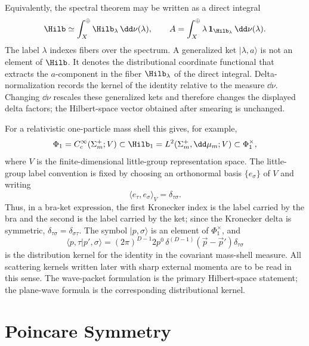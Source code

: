 \begin{definition}
\label{def:direct-integral-coordinate-ket}
Equivalently, the spectral theorem may be written as a direct integral
\[
  \Hilb
  \simeq
  \int_X^\oplus \Hilb_\lambda\,\dd\nu(\lambda),
  \qquad
  A
  =
  \int_X^\oplus \lambda\,\mathbf 1_{\Hilb_\lambda}\,\dd\nu(\lambda).
\]
The label \(\lambda\) indexes fibers over the spectrum. A generalized ket
\(|\lambda,a\rangle\) is not an element of \(\Hilb\).  It denotes the
distributional coordinate functional that extracts the \(a\)-component in the
fiber \(\Hilb_\lambda\) of the direct integral.  Delta-normalization records
the kernel of the identity relative to the measure \(\dd\nu\). Changing
\(\dd\nu\) rescales these generalized kets and therefore changes the displayed
delta factors; the Hilbert-space vector obtained after smearing is unchanged.
\end{definition}

\begin{definition}
\label{def:relativistic-one-particle-rigging}
For a relativistic one-particle mass shell this gives, for example,
\[
  \Phi_1
  =
  C_c^\infty(\Sigma_m^+;V)
  \subset
  \Hilb_1
  =
  L^2(\Sigma_m^+,\dd\mu_m;V)
  \subset
  \Phi_1^\times ,
\]
where \(V\) is the finite-dimensional little-group representation space. The
little-group label convention is fixed by choosing an orthonormal basis
\(\{e_\sigma\}\) of \(V\) and writing
\[
  \langle e_\tau,e_\sigma\rangle_V=\delta_{\tau\sigma}.
\]
Thus, in a bra-ket expression, the first Kronecker index is the label carried
by the bra and the second is the label carried by the ket; since the Kronecker
delta is symmetric, \(\delta_{\tau\sigma}=\delta_{\sigma\tau}\).  The symbol
\(|p,\sigma\rangle\) is an element of \(\Phi_1^\times\), and
\[
  \langle p,\tau|p',\sigma\rangle
  =
  (2\pi)^{D-1}2p^0\,
  \delta^{(D-1)}(\vec p-\vec p')
  \delta_{\tau\sigma}
\]
is the distribution kernel for the identity in the covariant mass-shell
measure. All scattering kernels written later with sharp external momenta
are to be read in this sense. The wave-packet formulation is the primary
Hilbert-space statement; the plane-wave formula is the corresponding
distributional kernel.
\end{definition}

\section{Poincare Symmetry}

